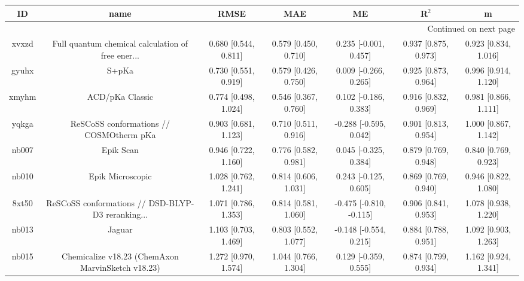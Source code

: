 \documentclass{article}
\begin{document}
\begin{center}
\begin{longtable}{|ccccccc|}
\toprule
    ID &                                               name &                  RMSE &                   MAE &                       ME &                 R$^2$ &                      m \\
\midrule
\endhead
\midrule
\multicolumn{7}{r}{{Continued on next page}} \\
\midrule
\endfoot

\bottomrule
\endlastfoot
 xvxzd &  Full quantum chemical calculation of free ener... &  0.680 [0.544, 0.811] &  0.579 [0.450, 0.710] &    0.235 [-0.001, 0.457] &  0.937 [0.875, 0.973] &   0.923 [0.834, 1.016] \\
 gyuhx &                                              S+pKa &  0.730 [0.551, 0.919] &  0.579 [0.426, 0.750] &    0.009 [-0.266, 0.265] &  0.925 [0.873, 0.964] &   0.996 [0.914, 1.120] \\
 xmyhm &                                    ACD/pKa Classic &  0.774 [0.498, 1.024] &  0.546 [0.367, 0.760] &    0.102 [-0.186, 0.383] &  0.916 [0.832, 0.969] &   0.981 [0.866, 1.111] \\
 yqkga &            ReSCoSS conformations // COSMOtherm pKa &  0.903 [0.681, 1.123] &  0.710 [0.511, 0.916] &   -0.288 [-0.595, 0.042] &  0.901 [0.813, 0.954] &   1.000 [0.867, 1.142] \\
 nb007 &                                          Epik Scan &  0.946 [0.722, 1.160] &  0.776 [0.582, 0.981] &    0.045 [-0.325, 0.384] &  0.879 [0.769, 0.948] &   0.840 [0.769, 0.923] \\
 nb010 &                                   Epik Microscopic &  1.028 [0.762, 1.241] &  0.814 [0.606, 1.031] &    0.243 [-0.125, 0.605] &  0.869 [0.769, 0.940] &   0.946 [0.822, 1.080] \\
 8xt50 &  ReSCoSS conformations // DSD-BLYP-D3 reranking... &  1.071 [0.786, 1.353] &  0.814 [0.581, 1.060] &  -0.475 [-0.810, -0.115] &  0.906 [0.841, 0.953] &   1.078 [0.938, 1.220] \\
 nb013 &                                             Jaguar &  1.103 [0.703, 1.469] &  0.803 [0.552, 1.077] &   -0.148 [-0.554, 0.215] &  0.884 [0.788, 0.951] &   1.092 [0.903, 1.263] \\
 nb015 &  Chemicalize v18.23 (ChemAxon MarvinSketch v18.23) &  1.272 [0.970, 1.574] &  1.044 [0.766, 1.304] &    0.129 [-0.359, 0.555] &  0.874 [0.799, 0.934] &   1.162 [0.924, 1.341] \\

\end{longtable}
\end{center}
\end{document}
